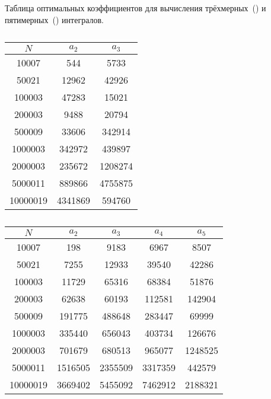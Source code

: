 \documentclass[a4paper,12pt]{article}
\begin{document}
\begin{table}
    \caption{Таблица оптимальных коэффициентов для вычисления трёхмерных~()
        и пятимерных~() интегралов.}
    \label{tab:Korobov}
    {\footnotesize
    \begin{subtable}[b]{.4\linewidth}
        \centering
    	\caption{}\label{tab:Korobov-a}
        \begin{tabular}{|c|c|c|}\hline
               \(N\) & \(a_2\) & \(a_3\)  \\\hline
               10007 &     544 &    5733  \\
               50021 &   12962 &   42926  \\
              100003 &   47283 &   15021  \\
              200003 &    9488 &   20794  \\
              500009 &   33606 &  342914  \\
             1000003 &  342972 &  439897  \\
             2000003 &  235672 & 1208274  \\
             5000011 &  889866 & 4755875  \\
            10000019 & 4341869 &  594760  \\\hline
    	\end{tabular}
    \end{subtable}
    \begin{subtable}[b]{.6\linewidth}
        \centering
    	\caption{}\label{tab:Korobov-b}
        \begin{tabular}{|c|c|c|c|c|}\hline
               \(N\) & \(a_2\) & \(a_3\) & \(a_4\) & \(a_5\)  \\\hline
               10007 &     198 &    9183 &    6967 &    8507  \\
               50021 &    7255 &   12933 &   39540 &   42286  \\
              100003 &   11729 &   65316 &   68384 &   51876  \\
              200003 &   62638 &   60193 &  112581 &  142904  \\
              500009 &  191775 &  488648 &  283447 &   69999  \\
             1000003 &  335440 &  656043 &  403734 &  126676  \\
             2000003 &  701679 &  680513 &  965077 & 1248525  \\
             5000011 & 1516505 & 2355509 & 3317359 &  442579  \\
            10000019 & 3669402 & 5455092 & 7462912 & 2188321  \\\hline
    	\end{tabular}
    \end{subtable}}
\end{table}
\end{document}
